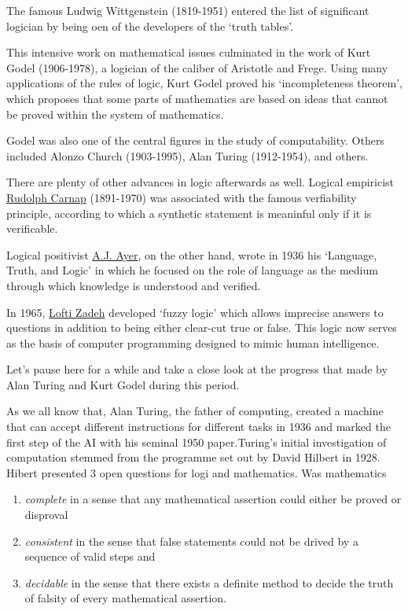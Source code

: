 \documentclass[]{book}
\theoremstyle{definition}
\theoremstyle{definition}
\theoremstyle{definition}
\theoremstyle{remark}
\begin{document}
The famous Ludwig Wittgenstein (1819-1951) entered the list of
significant logician by being oen of the developers of the `truth
tables'.

This intensive work on mathematical issues culminated in the work of
Kurt Godel (1906-1978), a logician of the caliber of Aristotle and
Frege. Using many applications of the rules of logic, Kurt Godel proved
his `incompleteness theorem', which proposes that some parts of
mathematics are based on ideas that cannot be proved within the system
of mathematics.

Godel was also one of the central figures in the study of computability.
Others included Alonzo Church (1903-1995), Alan Turing (1912-1954), and
others.

There are plenty of other advances in logic afterwards as well. Logical
empiricist \href{}{Rudolph Carnap} (1891-1970) was associated with the
famous verfiability principle, according to which a synthetic statement
is meaninful only if it is verificable.

Logical positivist \href{}{A.J. Ayer}, on the other hand, wrote in 1936
his `Language, Truth, and Logic' in which he focused on the role of
language as the medium through which knowledge is understood and
verified.

In 1965, \href{}{Lofti Zadeh} developed `fuzzy logic' which allows
imprecise answers to questions in addition to being either clear-cut
true or false. This logic now serves as the basis of computer
programming designed to mimic human intelligence.

Let's pause here for a while and take a close look at the progress that
made by Alan Turing and Kurt Godel during this period.

As we all know that, Alan Turing, the father of computing, created a
machine that can accept different instructions for different tasks in
1936 and marked the first step of the AI with his seminal 1950
paper.Turing's initial investigation of computation stemmed from the
programme set out by David Hilbert in 1928. Hibert presented 3 open
questions for logi and mathematics. Was mathematics

\begin{enumerate}
\def\labelenumi{\arabic{enumi}.}
\item
  \emph{complete} in a sense that any mathematical assertion could
  either be proved or disproval
\item
  \emph{consistent} in the sense that false statements could not be
  drived by a sequence of valid steps and
\item
  \emph{decidable} in the sense that there exists a definite method to
  decide the truth of falsity of every mathematical assertion.
\end{enumerate}
\end{document}
